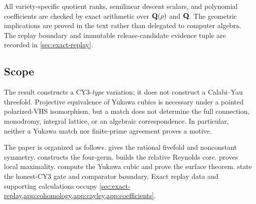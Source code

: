 All variety-specific quotient ranks, semilinear descent scalars, and
polynomial coefficients are checked by exact arithmetic over
\(\mathbf Q(\rho)\) and \(\mathbf Q\).  The geometric implications are proved in the
text rather than delegated to computer algebra.  The replay boundary and
immutable release-candidate evidence tuple are recorded in
\cref{sec:exact-replay}.

\subsection{Scope}

The result constructs a CY3-\emph{type} variation; it does not construct a
Calabi--Yau threefold.  Projective equivalence of Yukawa cubics is necessary
under a pointed polarized-VHS isomorphism, but a match does not determine the
full connection, monodromy, integral lattice, or an algebraic
correspondence.  In particular, neither a Yukawa match nor finite-prime
agreement proves a motive.

The paper is organized as follows.   gives the rational
fivefold and nonconstant symmetry.   constructs the
four-germ.   builds the relative Reynolds core.
 proves local maximality.
 compute the Yukawa cubic and
prove the surface theorem.   state the
honest-CY3 gate and comparator boundary.  Exact replay data and supporting
calculations occupy
\cref{sec:exact-replay,app:cohomology,app:cayley,app:coefficients}.
